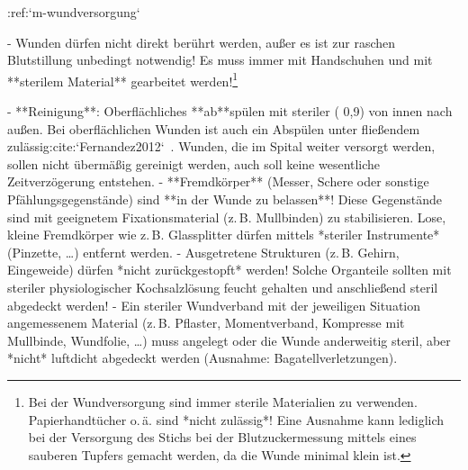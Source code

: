 :ref:`m-wundversorgung`
\begin{itemize}
  -   Wunden dürfen nicht direkt berührt werden, außer es
  ist zur raschen Blutstillung unbedingt notwendig! 
Es
  muss immer mit Handschuhen und mit **sterilem Material**
  gearbeitet werden!\footnote{Bei der Wundversorgung sind
  immer sterile Materialien zu verwenden. Papierhandtücher
  o.\,ä. sind *nicht zulässig*! Eine Ausnahme kann
  lediglich bei der Versorgung des Stichs bei der
  Blutzuckermessung mittels eines sauberen Tupfers gemacht
  werden, da die Wunde minimal klein ist.}
  
  -   **Reinigung**: Oberflächliches **ab**spülen mit
  steriler  (
  0,9\PC*) von innen
  nach außen. Bei oberflächlichen
  Wunden ist auch ein Abspülen unter fließendem  
  zulässig:cite:`Fernandez2012`\ . 
  Wunden, die im Spital
  weiter versorgt werden, sollen nicht übermäßig gereinigt werden, 
  auch soll keine
  wesentliche Zeitverzögerung entstehen.  
  -   **Fremdkörper** (Messer, Schere oder sonstige
  Pfählungsgegenstände) sind **in der Wunde zu belassen**!
  Diese Gegenstände sind mit geeignetem Fixationsmaterial
  (z.\,B. Mullbinden) zu stabilisieren. Lose, kleine
  Fremdkörper wie z.\,B. Glassplitter dürfen mittels *steriler Instrumente* (Pinzette, {\ldots}) entfernt
  werden.
  -   Ausgetretene Strukturen (z.\,B. Gehirn, Eingeweide)
  dürfen *nicht zurückgestopft* werden! Solche Organteile
  sollten mit steriler physiologischer Kochsalzlösung
feucht gehalten und anschließend steril abgedeckt werden! 
  -   Ein steriler
  Wundverband mit der jeweiligen Situation angemessenem
  Material (z.\,B. Pflaster, Momentverband, Kompresse mit
  Mullbinde, Wundfolie, \ldots) muss angelegt oder die
  Wunde anderweitig steril, aber *nicht* luftdicht
  abgedeckt werden (Ausnahme: Bagatellverletzungen).
\end{itemize}